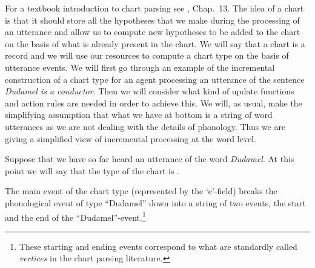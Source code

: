 For a textbook introduction
to chart parsing see \cite{JurafskyMartin2009}, Chap.~13.  The idea of
a chart is that it should store all the hypotheses that we make during
the processing of an utterance and allow us to compute new hypotheses
to be added to the chart
on the basis of what is already present in the chart.  We will say
that a chart is a record and we will use our resources to compute a
chart type on the basis of utterance events.  We will first go through
an example of the incremental construction of a chart type for an
agent processing an utterance of the sentence \textit{Dudamel is a
  conductor}.  Then we will consider what kind of update functions and
action rules are
needed in order to achieve this.  We will, as usual, make the
simplifying assumption that what we have at bottom is a string of word
utterances as we are not dealing with the details of phonology.  Thus
we are giving a simplified view of incremental processing at the word
level.

Suppose that we have so far heard an utterance of the word
\textit{Dudamel}.  At this point we will say that the type of the
chart is \nexteg{}.
\begin{ex} 
\label{ex:Dudamelchart}
\end{ex} 
The main event of the chart type (represented by the `e'-field) breaks
the phonological event of type ``Dudamel'' down into a string of two
events, the start and the end of the ``Dudamel''-event.\footnote{These
  starting and ending events correspond to what are standardly called
  \textit{vertices} in the chart parsing literature.}  

